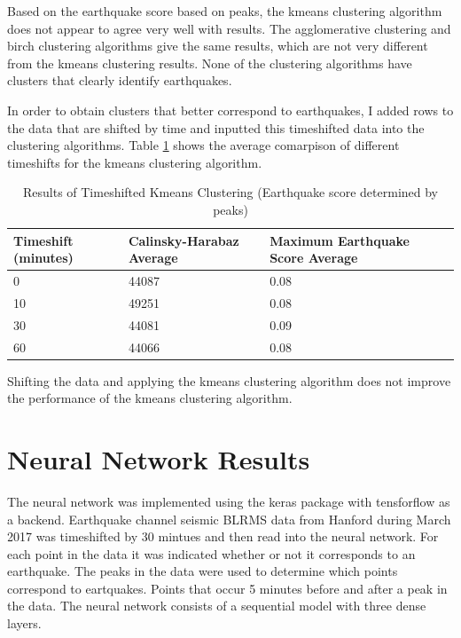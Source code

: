 \documentclass[colorlinks=true,pdfstartview=FitV,linkcolor=blue,
            citecolor=red,urlcolor=magenta]{ligodoc}
\begin{document}
\par Based on the earthquake score based on peaks, the kmeans clustering algorithm does not appear to agree very well with results.  The agglomerative clustering and birch clustering algorithms give the same results, which are not very different from the kmeans clustering results. None of the clustering algorithms have clusters that clearly identify earthquakes.  

\par In order to obtain clusters that better correspond to earthquakes, I added rows to the data that are shifted by time and inputted this timeshifted data into the clustering algorithms. Table \ref{Table 7} shows the average comarpison of different timeshifts for the kmeans clustering algorithm. 

\begin{table}[h!]
\centering
 \begin{tabular}{| m{4cm} m{4cm} m{4cm}|} 
 \hline
 Timeshift (minutes) & Calinsky-Harabaz Average & Maximum Earthquake Score Average\\ [0.5ex] 
 \hline\hline
 0 & 44087 & 0.08\\
 \hline
 10 & 49251 & 0.08\\
 \hline
 30 & 44081 & 0.09\\
 \hline
 60 & 44066 & 0.08\\
 \hline
 \end{tabular}
 \caption{Results of Timeshifted Kmeans Clustering (Earthquake score determined by peaks)}
 \label{Table 7}
\end{table}

\par Shifting the data and applying the kmeans clustering algorithm does not improve the performance of the kmeans clustering algorithm.  

\section{Neural Network Results}

\indent

\par The neural network was implemented using the keras package with tensforflow as a backend. Earthquake channel seismic BLRMS data from Hanford during March 2017 was timeshifted by 30 mintues and then read into the neural network. For each point in the data it was indicated whether or not it corresponds to an earthquake. The peaks in the data were used to determine which points correspond to eartquakes. Points that occur 5 minutes before and after a peak in the data. The neural network consists of a sequential model with three dense layers.
\end{document}
